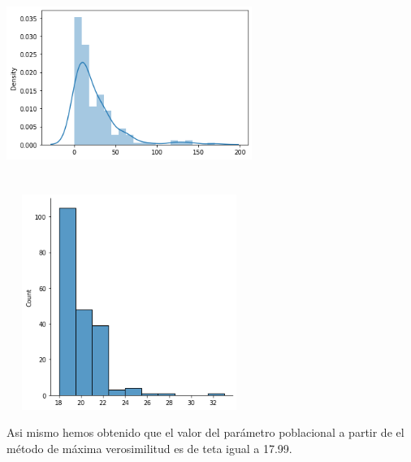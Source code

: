 \documentclass[12pt]{article}
\begin{document}
\includegraphics[width=8cm, height=7cm]{dist1}
\includegraphics[width=8cm, height=7cm]{dist2}

Asi mismo hemos obtenido que el valor del parámetro poblacional a partir de el método de máxima verosimilitud es de teta igual a 17.99.

\clearpage
\end{document}
